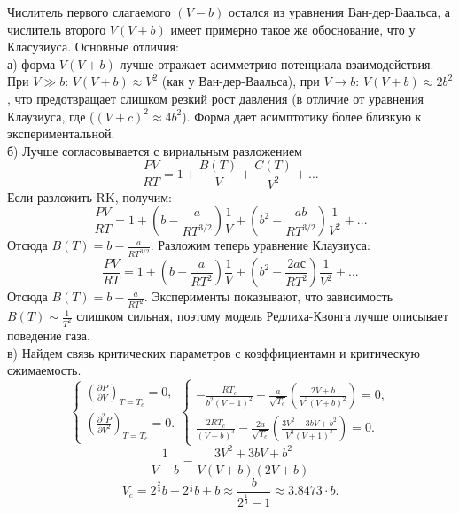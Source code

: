 \documentclass[a4paper]{article}
\numberwithin{equation}{subsection} %
\begin{document}
Числитель первого слагаемого $(V-b)$ остался из уравнения Ван-дер-Ваальса, а числитель второго $V(V+b)$ имеет примерно такое же обоснование, что у Класузиуса. Основные отличия:\\
а) форма $V(V+b)$ лучше отражает асимметрию потенциала взаимодействия. При $V \gg b$: $V(V+b) \approx V^2$ (как у Ван-дер-Ваальса), при $V \rightarrow b$: $V(V+b) \approx 2b^2$, что предотвращает слишком резкий рост давления (в отличие от уравнения Клаузиуса, где ($(V+c)^2 \approx 4b^2$). Форма дает асимптотику более близкую к экспериментальной.\\
б) Лучше согласовывается с вириальным разложением
\begin{equation*}
      \frac{PV}{RT} = 1 + \frac{B(T)}{V} + \frac{C(T)}{V^2} + . . .
\end{equation*}
Если разложить RK, получим:
\begin{equation*}
      \frac{PV}{RT} = 1 + \left( b - \frac{a}{RT^{3/2}}\right)\frac{1}{V} + \left( b^2 - \frac{ab}{RT^{3/2}}\right)\frac{1}{V^2} + . . .
\end{equation*}
Отсюда $B(T) = b - \frac{a}{RT^{3/2}}$. Разложим теперь уравнение Клаузиуса:
\begin{equation*}
      \frac{PV}{RT} = 1 + \left( b - \frac{a}{RT^{2}}\right)\frac{1}{V} + \left( b^2 - \frac{2aс}{RT^{2}}\right)\frac{1}{V^2} + . . .
\end{equation*}
Отсюда $B(T) = b - \frac{a}{RT^{2}}$. Эксперименты показывают, что зависимость $B(T) \sim \frac{1}{T^2}$ слишком сильная, поэтому модель Редлиха-Квонга лучше описывает поведение газа.\\
в) Найдем связь критических параметров с коэффициентами и критическую сжимаемость.
$$
\begin{cases}
\left( \frac{\partial P}{\partial V} \right)_{T=T_c} = 0,\\[10pt]
\left( \frac{\partial^2 P}{\partial V^2} \right)_{T=T_c} = 0.
\end{cases}
\begin{cases}
-\frac{R T_c}{b^2 (V - 1)^2} + \frac{a}{\sqrt{T_c}} \left( \frac{2V + b}{V^2 (V + b)^2} \right) = 0,\\[10pt]
\frac{2 R T_c}{ (V - b)^3} - \frac{2a}{\sqrt{T_c}} \left( \frac{3V^2 + 3bV + b^2}{V^3 (V + 1)^3}\right) = 0. 
\end{cases}
$$
\begin{equation*}
\frac{1}{V-b} = \frac{3V^2 + 3bV + b^2}{V(V+b)(2V+b)}
\end{equation*}
\begin{equation*}
V_c = 2^{\frac{2}{3}}b + 2^{\frac{1}{3}}b + b \approx \frac{b}{2^{\frac{1}{3}} - 1} \approx 3.8473 \cdot b.
\end{equation*}
\end{document}
